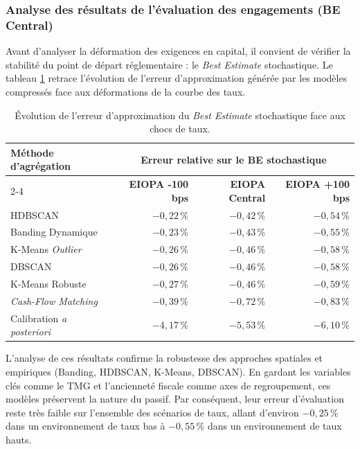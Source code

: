 \subsubsection{Analyse des résultats de l'évaluation des engagements (BE Central)}

Avant d'analyser la déformation des exigences en capital, il convient de vérifier la stabilité du point de départ réglementaire : le \textit{Best Estimate} stochastique. Le tableau \ref{tab:erreur_be_sensibilites} retrace l'évolution de l'erreur d'approximation générée par les modèles compressés face aux déformations de la courbe des taux.

\begin{table}[H]
    \centering
    \renewcommand{\arraystretch}{1.4}
    \begin{tabular}{|l|r|r|r|}
        \hline
        \multirow{2}{*}{\textbf{Méthode d'agrégation}} & \multicolumn{3}{c|}{\textbf{Erreur relative sur le BE stochastique}} \\
        \cline{2-4}
        & \textbf{EIOPA -100 bps} & \textbf{EIOPA Central} & \textbf{EIOPA +100 bps} \\
        \hline
        HDBSCAN & $-0{,}22\,\%$ & $-0{,}42\,\%$ & $-0{,}54\,\%$ \\
        Banding Dynamique & $-0{,}23\,\%$ & $-0{,}43\,\%$ & $-0{,}55\,\%$ \\
        K-Means \textit{Outlier} & $-0{,}26\,\%$ & $-0{,}46\,\%$ & $-0{,}58\,\%$ \\
        DBSCAN & $-0{,}26\,\%$ & $-0{,}46\,\%$ & $-0{,}58\,\%$ \\
        K-Means Robuste & $-0{,}27\,\%$ & $-0{,}46\,\%$ & $-0{,}59\,\%$ \\
        \textit{Cash-Flow Matching} & $-0{,}39\,\%$ & $-0{,}72\,\%$ & $-0{,}83\,\%$ \\
        Calibration \textit{a posteriori} & $-4{,}17\,\%$ & $-5{,}53\,\%$ & $-6{,}10\,\%$ \\
        \hline
    \end{tabular}
    \caption{Évolution de l'erreur d'approximation du \textit{Best Estimate} stochastique face aux chocs de taux.}
    \label{tab:erreur_be_sensibilites}
\end{table}

L'analyse de ces résultats confirme la robustesse des approches spatiales et empiriques (Banding, HDBSCAN, K-Means, DBSCAN). En gardant les variables clés comme le TMG et l'ancienneté fiscale comme axes de regroupement, ces modèles préservent la nature du passif. Par conséquent, leur erreur d'évaluation reste très faible sur l'ensemble des scénarios de taux, allant d'environ $-0{,}25\,\%$ dans un environnement de taux bas à $-0{,}55\,\%$ dans un environnement de taux hauts.

